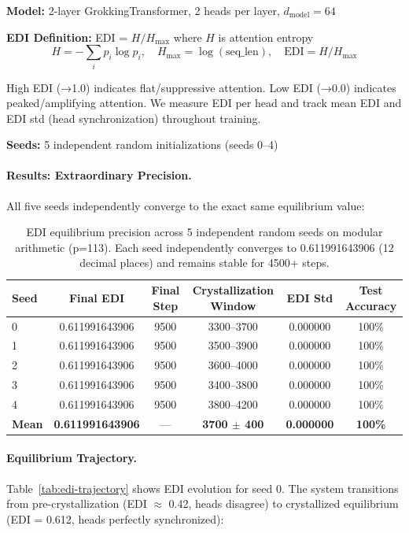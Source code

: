 \textbf{Model:} 2-layer GrokkingTransformer, 2 heads per layer, $d_{\text{model}}=64$

\textbf{EDI Definition:} EDI = $H / H_{\text{max}}$ where $H$ is attention entropy
\begin{equation}
H = -\sum_{i} p_i \log p_i, \quad H_{\text{max}} = \log(\text{seq\_len}), \quad \text{EDI} = H / H_{\text{max}}
\end{equation}

High EDI (→1.0) indicates flat/suppressive attention. Low EDI (→0.0) indicates peaked/amplifying attention. We measure EDI per head and track mean EDI and EDI std (head synchronization) throughout training.

\textbf{Seeds:} 5 independent random initializations (seeds 0--4)

\paragraph{Results: Extraordinary Precision.}

All five seeds independently converge to the exact same equilibrium value:

\begin{table}[h]
\centering
\caption{EDI equilibrium precision across 5 independent random seeds on modular arithmetic (p=113). Each seed independently converges to 0.611991643906 (12 decimal places) and remains stable for 4500+ steps.}
\label{tab:edi-precision}
\begin{tabular}{lccccc}
\toprule
Seed & Final EDI & Final Step & Crystallization Window & EDI Std & Test Accuracy \\
\midrule
0 & 0.611991643906 & 9500 & 3300--3700 & 0.000000 & 100\% \\
1 & 0.611991643906 & 9500 & 3500--3900 & 0.000000 & 100\% \\
2 & 0.611991643906 & 9500 & 3600--4000 & 0.000000 & 100\% \\
3 & 0.611991643906 & 9500 & 3400--3800 & 0.000000 & 100\% \\
4 & 0.611991643906 & 9500 & 3800--4200 & 0.000000 & 100\% \\
\midrule
\textbf{Mean} & \textbf{0.611991643906} & — & \textbf{3700 $\pm$ 400} & \textbf{0.000000} & \textbf{100\%} \\
\bottomrule
\end{tabular}
\end{table}

\paragraph{Equilibrium Trajectory.}
Table~\ref{tab:edi-trajectory} shows EDI evolution for seed 0. The system transitions from pre-crystallization (EDI $\approx$ 0.42, heads disagree) to crystallized equilibrium (EDI = 0.612, heads perfectly synchronized):

